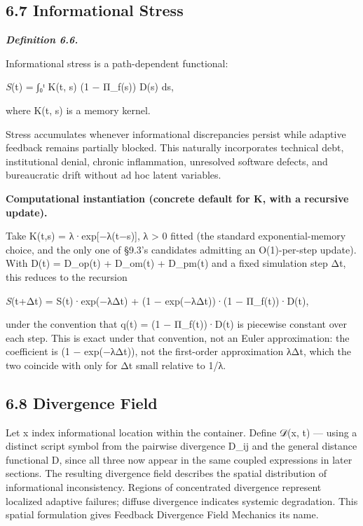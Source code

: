 \documentclass[
]{article}
\begin{document}
\hypertarget{informational-stress}{%
\subsection{6.7 Informational Stress}\label{informational-stress}}

\emph{\textbf{Definition 6.6.}}

Informational stress is a path-dependent functional:

\emph{S}(t) = ∫₀ᵗ K(t, s) (1 − Π\_f(s)) D(s) ds,

where K(t, s) is a memory kernel.

Stress accumulates whenever informational discrepancies persist while
adaptive feedback remains partially blocked. This naturally incorporates
technical debt, institutional denial, chronic inflammation, unresolved
software defects, and bureaucratic drift without ad hoc latent
variables.

\textbf{Computational instantiation (concrete default for K, with a
recursive update).}

Take K(t,s) = λ·exp{[}−λ(t−s){]}, λ \textgreater{} 0 fitted (the
standard exponential-memory choice, and the only one of §9.3's
candidates admitting an O(1)-per-step update). With D(t) = D\_op(t) +
D\_om(t) + D\_pm(t) and a fixed simulation step Δt, this reduces to the
recursion

\emph{S}(t+Δt) = S(t)·exp(−λΔt) + (1 − exp(−λΔt))·(1 − Π\_f(t))·D(t),

under the convention that q(t) = (1 − Π\_f(t))·D(t) is piecewise
constant over each step. This is exact under that convention, not an
Euler approximation: the coefficient is (1 − exp(−λΔt)), not the
first-order approximation λΔt, which the two coincide with only for Δt
small relative to 1/λ.

\hypertarget{divergence-field}{%
\subsection{6.8 Divergence Field}\label{divergence-field}}

Let x index informational location within the container. Define 𝒟(x, t)
--- using a distinct script symbol from the pairwise divergence D\_ij
and the general distance functional D, since all three now appear in the
same coupled expressions in later sections. The resulting divergence
field describes the spatial distribution of informational inconsistency.
Regions of concentrated divergence represent localized adaptive
failures; diffuse divergence indicates systemic degradation. This
spatial formulation gives Feedback Divergence Field Mechanics its name.
\end{document}
